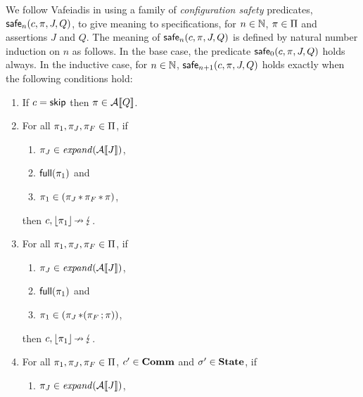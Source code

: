 \documentclass[11pt]{report}
\begin{document}
We follow Vafeiadis \cite{V11} in using a family of \emph{configuration safety} predicates, $\mathsf{safe}_{n}(c, \pi,J,Q)$, to give meaning to specifications, for $n \in \mathbb{N}$, $\pi \in \Pi$ and assertions $J$ and $Q$. The meaning of $\mathsf{safe}_{n}(c,\pi,J,Q)$ is defined by natural number induction on $n$ as follows. In the base case, the predicate $\mathsf{safe}_{0}(c,\pi,J,Q)$ holds always. In the inductive case, for $n \in \mathbb{N}$, $\mathsf{safe}_{n+1}(c, \pi,J,Q)$ holds exactly when the following conditions hold: \begin{enumerate}
	\item If $c = \operatorname{\mathsf{skip}}$ then $\pi \in \mathcal{A}[\![Q]\!]$. 
	
	\item For all $\pi_1,\pi_J,\pi_F \in \Pi$, if
	
	\begin{enumerate}
		
		\item $\pi_J \in \mathit{expand}(\mathcal{A}[\![J]\!])$,
		
		\item $\mathsf{full}(\pi_1)$ and
		
		\item $\pi_1 \in (\pi_J \operatorname{\ast} \pi_F \operatorname{\ast} \pi)$, 

	\end{enumerate} then $c,\left\lfloor\pi_1\right\rfloor \operatorname{\nrightarrow} \lightning$. 

	\item For all $\pi_1,\pi_J,\pi_F \in \Pi$, if 
	
	\begin{enumerate}
		
		\item $\pi_J \in \mathit{expand}(\mathcal{A}[\![J]\!])$,
		
		\item $\mathsf{full}(\pi_1)$ and
		
		\item $\pi_1 \in (\pi_J \operatorname{\ast} (\pi_F \operatorname{;} \pi))$, 
				
	\end{enumerate} then $c,\left\lfloor\pi_1\right\rfloor \operatorname{\nrightarrow} \lightning$. 

	
	\item For all $\pi_1,\pi_J,\pi_F \in \Pi$, $c' \in \mathbf{Comm}$ and $\sigma' \in \mathbf{State}$, if 
	
	\begin{enumerate}
		
		\item $\pi_J \in \mathit{expand}(\mathcal{A}[\![J]\!])$,
		

\end{enumerate}
\end{enumerate}
\end{document}
